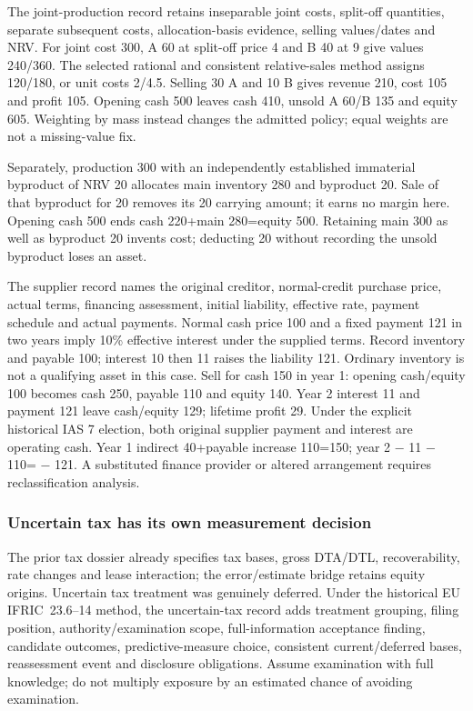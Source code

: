 The joint-production record retains inseparable joint costs, split-off quantities, separate subsequent costs, allocation-basis evidence, selling values/dates and NRV. For joint cost 300, A 60 at split-off price 4 and B 40 at 9 give values 240/360. The selected rational and consistent relative-sales method assigns 120/180, or unit costs 2/4.5. Selling 30 A and 10 B gives revenue 210, cost 105 and profit 105. Opening cash 500 leaves cash 410, unsold A 60/B 135 and equity 605. Weighting by mass instead changes the admitted policy; equal weights are not a missing-value fix.

Separately, production 300 with an independently established immaterial byproduct of NRV 20 allocates main inventory 280 and byproduct 20. Sale of that byproduct for 20 removes its 20 carrying amount; it earns no margin here. Opening cash 500 ends cash 220+main 280=equity 500. Retaining main 300 as well as byproduct 20 invents cost; deducting 20 without recording the unsold byproduct loses an asset.

The supplier record names the original creditor, normal-credit purchase price, actual terms, financing assessment, initial liability, effective rate, payment schedule and actual payments. Normal cash price 100 and a fixed payment 121 in two years imply 10\% effective interest under the supplied terms. Record inventory and payable 100; interest 10 then 11 raises the liability 121. Ordinary inventory is not a qualifying asset in this case. Sell for cash 150 in year 1: opening cash/equity 100 becomes cash 250, payable 110 and equity 140. Year 2 interest 11 and payment 121 leave cash/equity 129; lifetime profit 29. Under the explicit historical IAS 7 election, both original supplier payment and interest are operating cash. Year 1 indirect 40+payable increase 110=150; year 2 − 11 − 110= − 121. A substituted finance provider or altered arrangement requires reclassification analysis.

\hypertarget{uncertain-tax-has-its-own-measurement-decision}{%
\subsubsection{Uncertain tax has its own measurement decision}\label{uncertain-tax-has-its-own-measurement-decision}}

The prior tax dossier already specifies tax bases, gross DTA/DTL, recoverability, rate changes and lease interaction; the error/estimate bridge retains equity origins. Uncertain tax treatment was genuinely deferred. Under the historical EU IFRIC~23.6--14 \citep[IFRIC~23.6--14,A1--A5]{eu20231803} method, the uncertain-tax record adds treatment grouping, filing position, authority/examination scope, full-information acceptance finding, candidate outcomes, predictive-measure choice, consistent current/deferred bases, reassessment event and disclosure obligations. Assume examination with full knowledge; do not multiply exposure by an estimated chance of avoiding examination.


